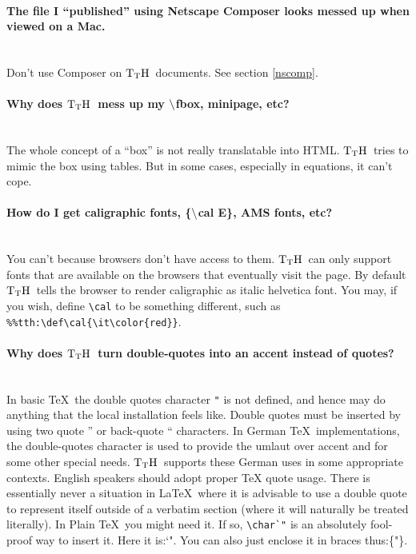 \documentclass[12pt]{article}
\def\TtH{$\rm{}T_TH$}
\begin{document}
\paragraph{The file I ``published'' using Netscape Composer looks
messed up when viewed on a Mac.}\leavevmode\\
Don't use Composer on \TtH\ documents. See section \ref{nscomp}.

\paragraph{Why does \TtH\ mess up my $\tt\backslash$fbox,
minipage, etc?}\leavevmode\\ The whole concept of a ``box'' is not really
translatable into HTML. \TtH\ tries to mimic the box using tables. But
in some cases, especially in equations, it can't cope.

\paragraph{How do I get caligraphic fonts, \{$\tt\backslash$cal E\}, AMS
fonts,  etc?}\leavevmode\\
You can't because browsers don't have access to them. \TtH\ can only
support fonts that are available on the browsers that eventually visit
the page. By default \TtH\ tells the browser to render caligraphic as
italic helvetica font. You may, if you wish, define \verb|\cal| to be
something different, such as \verb|%%tth:\def\cal{\it\color{red}}|.

\paragraph{Why does \TtH\ turn double-quotes into an accent
instead of quotes?}\leavevmode\\ In basic \TeX\ the double quotes character
\verb+"+ is not defined, and hence may do anything that the local
installation feels like. Double quotes must be inserted by using two
quote '' or back-quote `` characters.  In German \TeX\ implementations,
the double-quotes character is used to provide the umlaut over accent
and for some other special needs. \TtH\ supports these German uses in
some appropriate contexts. English speakers should adopt proper \TeX
quote usage.  There is essentially never a situation in \LaTeX\ where
it is advisable to use a double quote to represent itself outside of a
verbatim section (where it will naturally be treated literally). In
Plain \TeX\ you might need it. If so, \verb!\char`"! is an
absolutely fool-proof way to insert it. Here it is:\char`". 
You can also just enclose it in braces thus:\{{"}\}. 
\end{document}

